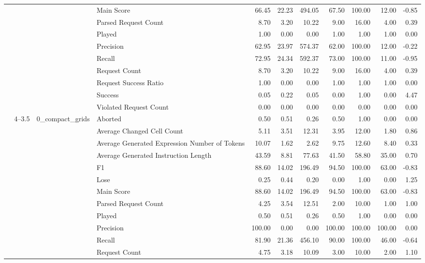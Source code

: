 \begin{tabular}{llllrrrrrrr}
 &  &  & Main Score & 66.45 & 22.23 & 494.05 & 67.50 & 100.00 & 12.00 & -0.85 \\
 &  &  & Parsed Request Count & 8.70 & 3.20 & 10.22 & 9.00 & 16.00 & 4.00 & 0.39 \\
 &  &  & Played & 1.00 & 0.00 & 0.00 & 1.00 & 1.00 & 1.00 & 0.00 \\
 &  &  & Precision & 62.95 & 23.97 & 574.37 & 62.00 & 100.00 & 12.00 & -0.22 \\
 &  &  & Recall & 72.95 & 24.34 & 592.37 & 73.00 & 100.00 & 11.00 & -0.95 \\
 &  &  & Request Count & 8.70 & 3.20 & 10.22 & 9.00 & 16.00 & 4.00 & 0.39 \\
 &  &  & Request Success Ratio & 1.00 & 0.00 & 0.00 & 1.00 & 1.00 & 1.00 & 0.00 \\
 &  &  & Success & 0.05 & 0.22 & 0.05 & 0.00 & 1.00 & 0.00 & 4.47 \\
 &  &  & Violated Request Count & 0.00 & 0.00 & 0.00 & 0.00 & 0.00 & 0.00 & 0.00 \\
\cline{2-11} \cline{3-11}
 & \multirow[t]{30}{*}{4--3.5} & \multirow[t]{15}{*}{0_compact_grids} & Aborted & 0.50 & 0.51 & 0.26 & 0.50 & 1.00 & 0.00 & 0.00 \\
 &  &  & Average Changed Cell Count & 5.11 & 3.51 & 12.31 & 3.95 & 12.00 & 1.80 & 0.86 \\
 &  &  & Average Generated Expression Number of Tokens & 10.07 & 1.62 & 2.62 & 9.75 & 12.60 & 8.40 & 0.33 \\
 &  &  & Average Generated Instruction Length & 43.59 & 8.81 & 77.63 & 41.50 & 58.80 & 35.00 & 0.70 \\
 &  &  & F1 & 88.60 & 14.02 & 196.49 & 94.50 & 100.00 & 63.00 & -0.83 \\
 &  &  & Lose & 0.25 & 0.44 & 0.20 & 0.00 & 1.00 & 0.00 & 1.25 \\
 &  &  & Main Score & 88.60 & 14.02 & 196.49 & 94.50 & 100.00 & 63.00 & -0.83 \\
 &  &  & Parsed Request Count & 4.25 & 3.54 & 12.51 & 2.00 & 10.00 & 1.00 & 1.00 \\
 &  &  & Played & 0.50 & 0.51 & 0.26 & 0.50 & 1.00 & 0.00 & 0.00 \\
 &  &  & Precision & 100.00 & 0.00 & 0.00 & 100.00 & 100.00 & 100.00 & 0.00 \\
 &  &  & Recall & 81.90 & 21.36 & 456.10 & 90.00 & 100.00 & 46.00 & -0.64 \\
 &  &  & Request Count & 4.75 & 3.18 & 10.09 & 3.00 & 10.00 & 2.00 & 1.10 \\

\end{tabular}
